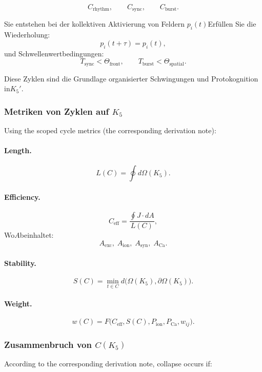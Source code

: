 \[
  C_{\mathrm{rhythm}},
  \qquad
  C_{\mathrm{sync}},
  \qquad
  C_{\mathrm{burst}}.
\]

Sie entstehen bei der kollektiven Aktivierung von Feldern
$p_i(t)$Erfüllen Sie die Wiederholung:
\[
  p_i(t+\tau) = p_i(t),
\]
und Schwellenwertbedingungen:
\[
  T_{\mathrm{sync}} < \Theta_{\mathrm{front}},\qquad
  T_{\mathrm{burst}} < \Theta_{\mathrm{spatial}}.
\]

Diese Zyklen sind die Grundlage organisierter Schwingungen und
Protokognition in$K_5'$.

\subsubsection{Metriken von Zyklen auf \texorpdfstring{$K_5$}{K_5}}

Using the scoped cycle metrics (the corresponding derivation note):

\paragraph{Length.}
\[
  L(C)=\oint d\Omega(K_5).
\]

\paragraph{Efficiency.}
\[
  C_{\mathrm{eff}}=\frac{\oint J\cdot dA}{L(C)},
\]
Wo$A$beinhaltet:
\[
  A_{\mathrm{exc}},\;
  A_{\mathrm{ion}},\;
  A_{\mathrm{syn}},\;
  A_{\mathrm{Ca}}.
\]

\paragraph{Stability.}
\[
S(C) =
    \min\limits_{t\in C}
      d\bigl(\Omega(K_5),\partial\Omega(K_5)\bigr).
\]

\paragraph{Weight.}
\[
w(C) =
    F\bigl(C_{\mathrm{eff}}, S(C), P_{\mathrm{ion}},
      P_{\mathrm{Ca}}, w_{ij}\bigr).
\]

\subsubsection{Zusammenbruch von \texorpdfstring{$C(K_5)$}{C(K_5)}}

According to the corresponding derivation note, collapse occurs if:

